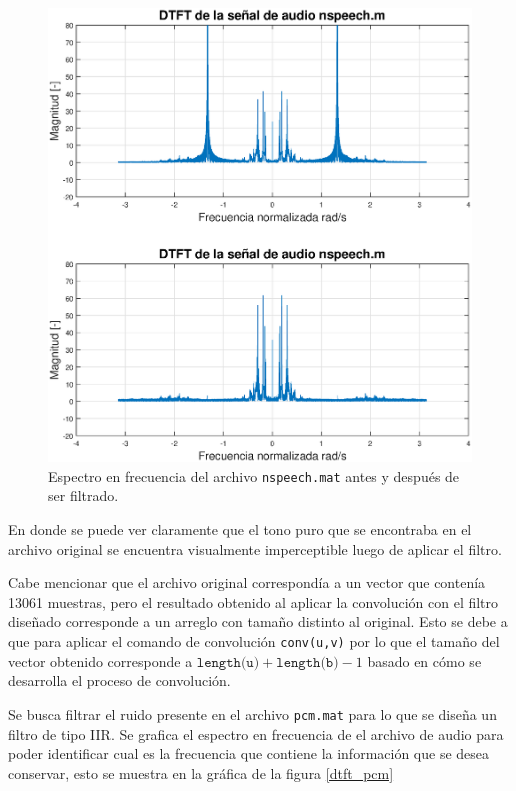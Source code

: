 \begin{figure}[H]
    \centering
    \includegraphics[scale = 0.4]{Figuras/p1_3-nspeech_filtrada.eps}
    \caption{Espectro en frecuencia del archivo \texttt{nspeech.mat} antes y después de ser filtrado.}
    \label{Fir}
\end{figure}

En donde se puede ver claramente que el tono puro que se encontraba en el archivo original se encuentra visualmente imperceptible luego de aplicar el filtro.

Cabe mencionar que el archivo original correspondía a un vector que contenía 13061 muestras, pero el resultado obtenido al aplicar la convolución con el filtro diseñado corresponde a un arreglo con tamaño distinto al original. Esto se debe a que para aplicar el comando de convolución \texttt{conv(u,v)} por lo que el tamaño del vector obtenido corresponde a $ \texttt{length(u)} + \texttt{length(b)} -1$ basado en  cómo se desarrolla el proceso de convolución.



\item Se busca filtrar el ruido presente en el archivo \texttt{pcm.mat} para lo que se diseña un filtro de tipo IIR. Se grafica el espectro en frecuencia de el archivo de audio para poder identificar cual es la frecuencia que contiene la  información que se desea conservar, esto se muestra en la gráfica de la figura \ref{dtft_pcm}

